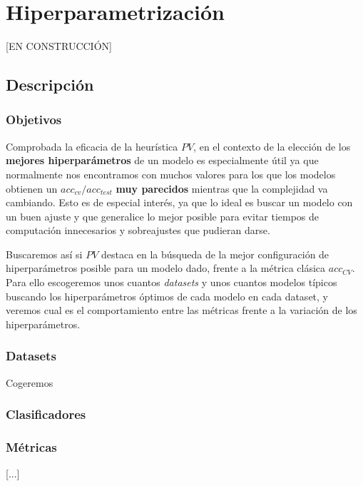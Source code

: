 \section{Hiperparametrización}

[EN CONSTRUCCIÓN]

\subsection{Descripción}

\subsubsection{Objetivos}

Comprobada la eficacia de la heurística $PV$, en el contexto de la elección de los \textbf{mejores hiperparámetros} de un modelo es especialmente útil ya que normalmente nos encontramos con muchos valores para los que los modelos obtienen un $acc_{cv}/acc_{test}$ \textbf{muy parecidos} mientras que la complejidad va cambiando. Esto es de especial interés, ya que lo ideal es buscar un modelo con un buen ajuste y que generalice lo mejor posible para evitar tiempos de computación innecesarios y sobreajustes que pudieran darse.

Buscaremos así  si $PV$ destaca en la búsqueda de la mejor configuración de hiperparámetros posible para un modelo dado, frente a la métrica clásica $acc_{CV}$. Para ello escogeremos unos cuantos \emph{datasets} y unos cuantos modelos típicos buscando los hiperparámetros óptimos de cada modelo en cada dataset, y veremos cual es el comportamiento entre las métricas frente a la variación de los hiperparámetros.

\subsubsection{Datasets}

Cogeremos

\subsubsection{Clasificadores}


\subsubsection{Métricas}






[...]

